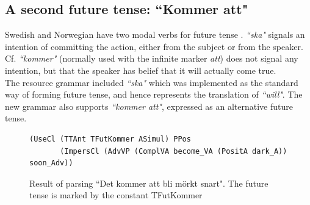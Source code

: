 \documentclass{report}
\begin{document}

\subsection{A second future tense: ``Kommer att"}
Swedish and Norwegian have two modal verbs for future tense
\cite[p. 246]{H&H}.
\emph{``ska"} signals an intention of committing the action, either from the subject or from
the speaker. Cf.
\emph{``kommer"} (normally used with the infinite marker \emph{att}) 
does not signal any intention, but that the speaker has belief that 
it will actually come true.\\
The resource grammar included 
\emph{``ska"} which was implemented as the standard way of forming future
tense, and hence represents the translation of
\emph{``will"}. 
The new grammar also supports \emph{``kommer att"}, expressed as an alternative
future tense.
\begin{figure}[h]
\begin{verbatim}
(UseCl (TTAnt TFutKommer ASimul) PPos 
       (ImpersCl (AdvVP (ComplVA become_VA (PositA dark_A)) soon_Adv))
\end{verbatim}
\caption{Result of parsing ``Det kommer att bli mörkt snart". The future tense
         is marked by the constant TFutKommer}
  \label{fig:kommeratt}
\end{figure}
\end{document}
